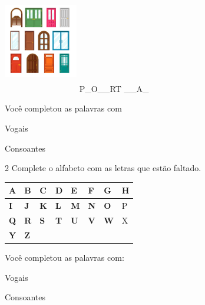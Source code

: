 \includegraphics[width=1.27083in,height=1.80035in]{media/image4.jpeg}
P\_O\_\_RT \_\_A\_


Você completou as palavras com

\begin{boxlist}
\boxitem[] Vogais 

\boxitem[] Consoantes
\end{boxlist}


\num{2} Complete o alfabeto com as letras que estão faltado.

\begin{longtable}[]{@{}llllllll@{}}
\toprule
\textbf{A } & \textbf{B} & \textbf{C} & \textbf{D} & \textbf{E} &
\textbf{F} & \textbf{G} & H\tabularnewline
\midrule
\endhead
\textbf{I} & \textbf{J} & \textbf{K} & \textbf{L} & \textbf{M} &
\textbf{N} & \textbf{O} & P\tabularnewline
\textbf{Q} & \textbf{R} & \textbf{S} & \textbf{T} & \textbf{U} &
\textbf{V} & \textbf{W} & X\tabularnewline
\textbf{Y} & \textbf{Z}\tabularnewline
\bottomrule
\end{longtable}

Você completou as palavras com:

\begin{boxlist}
\boxitem[] Vogais 

\boxitem[] Consoantes
\end{boxlist}

